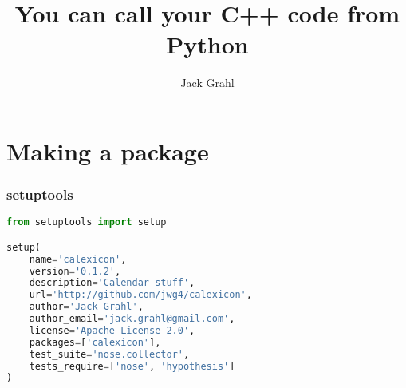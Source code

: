 \documentclass{beamer}
\title{You can call your C++ code from Python}
\author{Jack Grahl}
\institute{PrismFP Analytics}
\begin{document}
	\frame{\titlepage}
	\section[Section]{Making a package}
	\begin{frame}[fragile]
		\frametitle{setuptools}
			\begin{lstlisting}[language=Python]
from setuptools import setup

setup(
    name='calexicon',
    version='0.1.2',
    description='Calendar stuff',
    url='http://github.com/jwg4/calexicon',
    author='Jack Grahl',
    author_email='jack.grahl@gmail.com',
    license='Apache License 2.0',
    packages=['calexicon'],
    test_suite='nose.collector',
    tests_require=['nose', 'hypothesis']
)
		\end{lstlisting}
	\end{frame}
\end{document}

